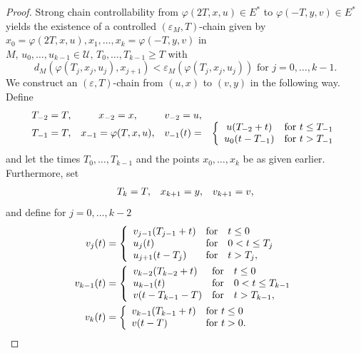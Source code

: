 \documentclass[10pt,a4paper]{amsart}
\begin{document}
\begin{proof}
Strong chain controllability from $\varphi(2T,x,u)\in E^{\ast}$ to
$\varphi(-T,y,v)\in E^{\ast}$ yields the existence of a controlled
$(\varepsilon_{M},T)$-chain given by $x_{0}=\varphi(2T,x,u),x_{1},\ldots
,x_{k}=\varphi(-T,y,v)$ in $M,\,u_{0},\ldots,u_{k-1}\in\mathcal{U}%
,\,T_{0},\ldots,T_{k-1}\geq T$ with
\begin{equation}
d_{M}(\varphi(T_{j},x_{j},u_{j}),x_{j+1})<\varepsilon_{M}(\varphi(T_{j}%
,x_{j},u_{j}))\text{\ for }j=0,\ldots,k-1. \label{r1}%
\end{equation}
We construct an $(\varepsilon,T)$-chain from $(u,x)$ to $(v,y)$ in the
following way. Define
\[%
\begin{array}
[c]{cccc}%
T_{-2}=T, & x_{-2}=x, & v_{-2}=u, & \\
T_{-1}=T, & x_{-1}=\varphi(T,x,u), & v_{-1}(t)= & \left\{
\begin{array}
[c]{cc}%
u(T_{-2}+t) & \text{for }t\leq T_{-1}\\
u_{0}(t-T_{-1}) & \text{for }t>T_{-1}%
\end{array}
\right.
\end{array}
\]
and let the times $T_{0},\ldots,T_{k-1}$ and the points $x_{0},\ldots,x_{k}$
be as given earlier. Furthermore, set
\[%
\begin{array}
[c]{ccc}%
T_{k}=T, & x_{k+1}=y, & v_{k+1}=v,
\end{array}
\]
and define for $j=0,\ldots,k-2$%
\begin{align*}
v_{j}(t)  &  =\left\{
\begin{array}
[c]{lll}%
v_{j-1}(T_{j-1}+t) & \text{for} & t\leq0\\
u_{j}(t) & \text{for} & 0<t\leq T_{j}\\
u_{j+1}(t-T_{j}) & \text{for} & t>T_{j},
\end{array}
\right. \\
v_{k-1}(t)  &  =\left\{
\begin{array}
[c]{lll}%
v_{k-2}(T_{k-2}+t) & \text{for} & t\leq0\\
u_{k-1}(t) & \text{for} & 0<t\leq T_{k-1}\\
v(t-T_{k-1}-T) & \text{for} & t>T_{k-1},
\end{array}
\right. \\
v_{k}(t)  &  =\left\{
\begin{array}
[c]{ll}%
v_{k-1}(T_{k-1}+t) & \text{for }t\leq0\\
v(t-T) & \text{for }t>0.
\end{array}
\right.
\end{align*}

\end{proof}
\end{document}
